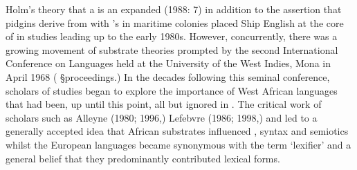 Holm’s theory that a  is an expanded  (1988: 7) in addition to the assertion that pidgins derive from  with ’s  in maritime colonies placed Ship English at the core of  in studies leading up to the early 1980s. However, concurrently, there was a growing movement of substrate theories prompted by the second International Conference on  Languages held at the University of the West Indies, Mona in April {1968} (\citealt{Hymes1971} §proceedings.) In the decades following this seminal conference, scholars of  studies began to explore the importance of West African languages that had been, up until this point, all but ignored in . The critical work of scholars such as Alleyne (1980; 1996,) Lefebvre (1986; 1998,) and \citet{Parkvall2000} led to a generally accepted idea that African substrates influenced  , syntax and semiotics whilst the  European languages became synonymous with the term ‘lexifier’ and a general belief that they predominantly contributed lexical forms.

